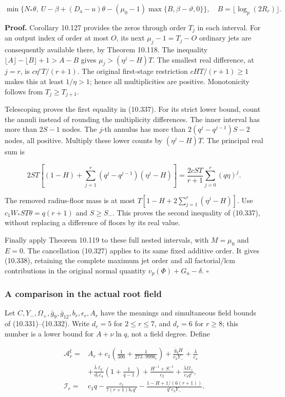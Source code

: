 \documentclass[
  11pt,
  a4paper,
]{article}
\begin{document}
\[
\min\{N_*\theta,\ U-\beta+(D_{\mathrm a}-u)\theta
-(\mu_0-1)\max\{B,\beta-\vartheta,0\}\},
\quad B=\lfloor\log_p(2R_r)\rfloor.
\tag{10.338}
\]

\textbf{Proof.} Corollary 10.127 provides the zeros through order
\(T_j\) in each interval. For an output index of order at most \(O\),
its next \(\mu_j-1=T_j-O\) ordinary jets are consequently available
there, by Theorem 10.118. The inequality
\(\lfloor A\rfloor-\lfloor B\rfloor+1>A-B\) gives \(\mu_j>(\eta^j-H)T\).
The smallest real difference, at \(j=r\), is \(c\eta^rT/(r+1)\). The
original first-stage restriction \(cHT/(r+1)\ge1\) makes this at least
\(1/\eta>1\); hence all multiplicities are positive. Monotonicity
follows from \(T_j\ge T_{j+1}\).

Telescoping proves the first equality in (10.337). For its strict lower
bound, count the annuli instead of rounding the multiplicity
differences. The inner interval has more than \(2S-1\) nodes. The
\(j\)-th annulus has more than \(2(q^j-q^{j-1})S-2\) nodes, all
positive. Multiply these lower counts by \((\eta^j-H)T\). The principal
real sum is

\[
2ST\left[(1-H)+\sum_{j=1}^r(q^j-q^{j-1})(\eta^j-H)\right]
=\frac{2cST}{r+1}\sum_{j=0}^r(q\eta)^j.
\]

The removed radius-floor mass is at most
\(T[1-H+2\sum_{j=1}^r(\eta^j-H)]\). Use \(c_1W_*ST\theta=q(r+1)\) and
\(S\ge S_-\). This proves the second inequality of (10.337), without
replacing a difference of floors by its real value.

Finally apply Theorem 10.119 to these full nested intervals, with
\(M=\mu_0\) and \(E=0\). The cancellation (10.327) applies to its same
fixed additive order. It gives (10.338), retaining the complete maximum
jet order and all factorial/lcm contributions in the original normal
quantity \(v_p(\Phi)+G_u-\delta\). \(\square\)

\subsubsection{A comparison in the actual root
field}\label{a-comparison-in-the-actual-root-field}

Let \(C,Y_-,\Omega_+,\bar g_9,\bar g_{12},b_r,\epsilon_r,A_r\) have the
meanings and simultaneous field bounds of (10.331)--(10.332). Write
\(d_r=5\) for \(2\le r\le7\), and \(d_r=6\) for \(r\ge8\); this number
is a lower bound for \(A+\nu\ln q\), not a field degree. Define

\[
\begin{aligned}
\mathcal A_r^{\mathrm f}={}&A_r+
c_1\left(\frac1{300}+\frac1{273\cdot999b_r}\right)
 +\frac{\bar g_9H}{c_3Y_-}+\frac{\bar\lambda}{c_4}\\
&+\frac{\bar\lambda\ell_q}{d_rc_4}
\left(1+\frac1{q-1}\right)
 +\frac{H^{-1}+S_-^{-1}}{c_2}
 +\frac{\bar\lambda\Omega_+}{c_4q^r},\\
\mathcal I_r={}&c_1q-
\frac{c_1}{7(r+1)b_rq^r}
 -\frac{1-H+1/(6(r+1))}{q^rc_3Y_-}.
\end{aligned}
\tag{10.339}
\]
\end{document}
